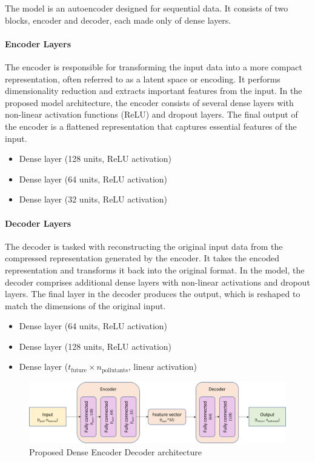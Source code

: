The model is an autoencoder designed for sequential data. It consists of two blocks, encoder and decoder, each made only of dense layers.

\paragraph{Encoder Layers}
The encoder is responsible for transforming the input data into a more compact representation, often referred to as a latent space or encoding. It performs dimensionality reduction and extracts important features from the input. In the proposed model architecture, the encoder consists of several dense layers with non-linear activation functions (ReLU) and dropout layers. The final output of the encoder is a flattened representation that captures essential features of the input.
\begin{itemize}[noitemsep]
  \item Dense layer (128 units, ReLU activation)
  \item Dense layer (64 units, ReLU activation)
  \item Dense layer (32 units, ReLU activation)
\end{itemize}

\paragraph{Decoder Layers}
The decoder is tasked with reconstructing the original input data from the compressed representation generated by the encoder. It takes the encoded representation and transforms it back into the original format. In the model, the decoder comprises additional dense layers with non-linear activations and dropout layers. The final layer in the decoder produces the output, which is reshaped to match the dimensions of the original input.
\begin{itemize}[noitemsep]
  \item Dense layer (64 units, ReLU activation)
  \item Dense layer (128 units, ReLU activation)
  \item Dense layer (\( t_{\text{future}} \times n_{\text{pollutants}} \), linear activation)
\end{itemize}

\begin{figure}
    \centering
    \includegraphics[width=1\linewidth]{images/model architectures/denseencdecmodel.png}
    \caption{Proposed Dense Encoder Decoder architecture}
    \label{fig:denseencdecmodel}
\end{figure}

